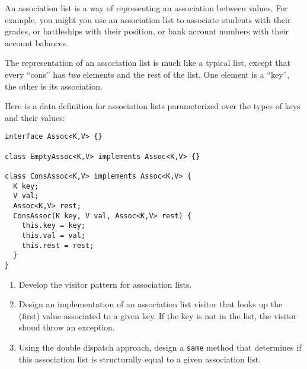 \documentclass[11pt]{article}
\def\pts#1{\marginpar{\footnotesize \raggedright  \fbox{#1 {\sc Points}}}}
\newcounter{Pctr}
\newenvironment{problem}{\stepcounter{Pctr}%
\begin{description}
\item[\noindent{\bf Problem} \arabic{Pctr}] 
\end{description}}{\relax}
\begin{document}
\pts{45}
\begin{problem}
An association list is a way of representing an association between
values.  For example, you might you use an association list to
associate students with their grades, or battleships with their
position, or bank account numbers with their account balances.

The representation of an association list is much like a typical list,
except that every ``cons'' has \emph{two} elements and the rest of the
list.  One element is a ``key'', the other is its association.

Here is a data definition for association lists parameterized over the
types of keys and their values:

\begin{verbatim}
interface Assoc<K,V> {}

class EmptyAssoc<K,V> implements Assoc<K,V> {}

class ConsAssoc<K,V> implements Assoc<K,V> {
  K key;
  V val;
  Assoc<K,V> rest;
  ConsAssoc(K key, V val, Assoc<K,V> rest) {
    this.key = key;
    this.val = val;
    this.rest = rest;
  }
}
\end{verbatim}

\begin{enumerate}
\item Develop the visitor pattern for association lists.
\item Design an implementation of an association list visitor that
  looks up the (first) value associated to a given key.  If the key is
  not in the list, the visitor shoud throw an exception.
\item Using the double dispatch approach, design a {\tt same} method
  that determines if this association list is structurally equal to a
  given association list.
\end{enumerate}
\end{problem}
\newpage
\ 
\newpage
\ 
\end{document}
